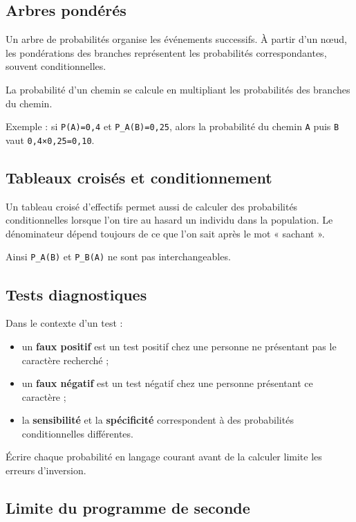 \subsection{Arbres pondérés}

Un arbre de probabilités organise les événements successifs. À partir d'un nœud, les pondérations des branches représentent les probabilités correspondantes, souvent conditionnelles.

La probabilité d'un chemin se calcule en multipliant les probabilités des branches du chemin.

Exemple : si \texttt{P(A)=0,4} et \texttt{P_A(B)=0,25}, alors la probabilité du chemin \texttt{A} puis \texttt{B} vaut \texttt{0,4×0,25=0,10}.

\subsection{Tableaux croisés et conditionnement}

Un tableau croisé d'effectifs permet aussi de calculer des probabilités conditionnelles lorsque l'on tire au hasard un individu dans la population. Le dénominateur dépend toujours de ce que l'on sait après le mot « sachant ».

Ainsi \texttt{P_A(B)} et \texttt{P_B(A)} ne sont pas interchangeables.

\subsection{Tests diagnostiques}

Dans le contexte d'un test :

\begin{itemize}
\item un \textbf{faux positif} est un test positif chez une personne ne présentant pas le caractère recherché ;
\item un \textbf{faux négatif} est un test négatif chez une personne présentant ce caractère ;
\item la \textbf{sensibilité} et la \textbf{spécificité} correspondent à des probabilités conditionnelles différentes.
\end{itemize}

Écrire chaque probabilité en langage courant avant de la calculer limite les erreurs d'inversion.

\subsection{Limite du programme de seconde}

